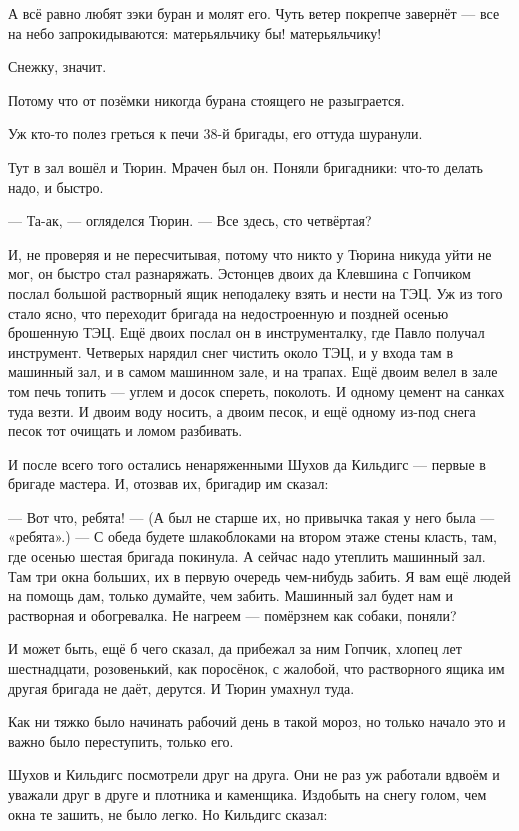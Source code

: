 А всё равно любят зэки буран и молят его. Чуть ветер покрепче завернёт --- все на небо 
запрокидываются: матерьяльчику бы! матерьяльчику!

Снежку, значит.

Потому что от позёмки никогда бурана стоящего не разыграется.

Уж кто-то полез греться к печи 38-й бригады, его оттуда шуранули.

Тут в зал вошёл и Тюрин. Мрачен был он. Поняли бригадники: что-то делать надо, и быстро.

--- Та-ак, --- огляделся Тюрин. --- Все здесь, сто четвёртая?

И, не проверяя и не пересчитывая, потому что никто у Тюрина никуда уйти не мог, он быстро стал 
разнаряжать. Эстонцев двоих да Клевшина с Гопчиком послал большой растворный ящик 
неподалеку взять и нести на ТЭЦ. Уж из того стало ясно, что переходит бригада на 
недостроенную и поздней осенью брошенную ТЭЦ. Ещё двоих послал он в инструменталку, где 
Павло получал инструмент. Четверых нарядил снег чистить около ТЭЦ, и у входа там в машинный 
зал, и в самом машинном зале, и на трапах. Ещё двоим велел в зале том печь топить --- углем и 
досок спереть, поколоть. И одному цемент на санках туда везти. И двоим воду носить, а двоим 
песок, и ещё одному из-под снега песок тот очищать и ломом разбивать.

И после всего того остались ненаряженными Шухов да Кильдигс --- первые в бригаде мастера. И, 
отозвав их, бригадир им сказал:

--- Вот что, ребята! --- (А был не старше их, но привычка такая у него была --- «ребята».) --- С обеда 
будете шлакоблоками на втором этаже стены класть, там, где осенью шестая бригада покинула. А 
сейчас надо утеплить машинный зал. Там три окна больших, их в первую очередь чем-нибудь 
забить. Я вам ещё людей на помощь дам, только думайте, чем забить. Машинный зал будет нам и 
растворная и обогревалка. Не нагреем --- помёрзнем как собаки, поняли?

И может быть, ещё б чего сказал, да прибежал за ним Гопчик, хлопец лет шестнадцати, 
розовенький, как поросёнок, с жалобой, что растворного ящика им другая бригада не даёт, 
дерутся. И Тюрин умахнул туда.

Как ни тяжко было начинать рабочий день в такой мороз, но только начало это и важно было 
переступить, только его.

Шухов и Кильдигс посмотрели друг на друга. Они не раз уж работали вдвоём и уважали друг в 
друге и плотника и каменщика. Издобыть на снегу голом, чем окна те зашить, не было легко. Но 
Кильдигс сказал:

